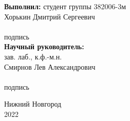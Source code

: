 \begin{titlepage}
\begin{minipage}[t]{.36\linewidth}
\begin{flushleft}
			\textbf{Выполнил:} студент группы 382006-3м \\
			Хорькин Дмитрий Сергеевич\\
			\vspace{1.0em}
			\hrulefill  \\
			{\small подпись}\\
			
			\vspace{1.5em}
			\textbf{Научный руководитель:}\\
		зав. лаб., к.ф.-м.н.\\
			Смирнов Лев Александрович\\
			\vspace{1.0em}
			\hrulefill  \\
			{\small подпись}
			
    	\end{flushleft}
    \end{minipage}

	\vspace{\fill}

	\begin{center}
		Нижний Новгород \\
		2022
	\end{center}

\end{titlepage}